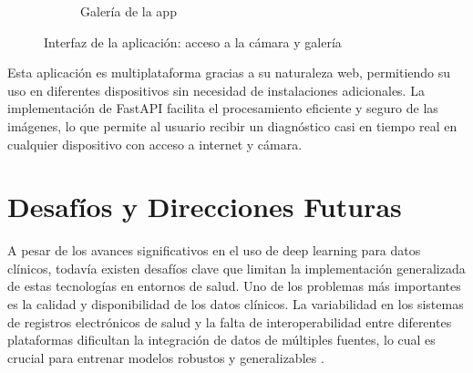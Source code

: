 \documentclass{article}
\begin{document}
\begin{figure}[ht!]
\begin{subfigure}[t]{0.45\textwidth}
		\caption{Galería de la app}
	\end{subfigure}
	\caption{Interfaz de la aplicación: acceso a la cámara y galería}
	\label{fig:app_interface}
\end{figure}
Esta aplicación es multiplataforma gracias a su naturaleza web, permitiendo su uso en diferentes dispositivos sin necesidad de instalaciones adicionales. La implementación de FastAPI facilita el procesamiento eficiente y seguro de las imágenes, lo que permite al usuario recibir un diagnóstico casi en tiempo real en cualquier dispositivo con acceso a internet y cámara.
\section{Desafíos y Direcciones Futuras}

A pesar de los avances significativos en el uso de deep learning para datos clínicos, todavía existen desafíos clave que limitan la implementación generalizada de estas tecnologías en entornos de salud. Uno de los problemas más importantes es la calidad y disponibilidad de los datos clínicos. La variabilidad en los sistemas de registros electrónicos de salud y la falta de interoperabilidad entre diferentes plataformas dificultan la integración de datos de múltiples fuentes, lo cual es crucial para entrenar modelos robustos y generalizables \cite{johnson2016mimic}.
\end{document}
